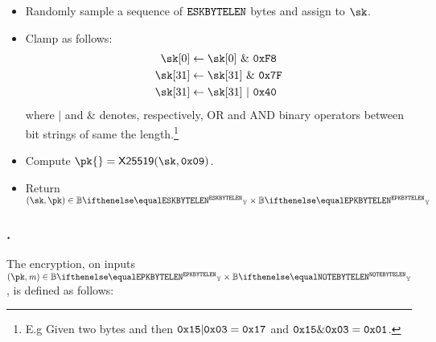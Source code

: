 \begin{itemize}
    \item Randomly sample a sequence of $\mathtt{ESKBYTELEN}$ bytes and assign to $\sk$.
    \item Clamp \sk{} as follows:
    \begin{align*}
        \sk[0] &\gets \sk[0]\ \&\ \bytestyle{F8}\\
        \sk[31] &\gets \sk[31]\ \&\ \bytestyle{7F}\\
        \sk[31] &\gets \sk[31]\ |\ \bytestyle{40}
    \end{align*}
    where $|$ and $\&$ denotes, respectively, OR and AND binary operators between bit strings of same the length.\footnote{E.g Given two bytes  and  then $\texttt{0x15} | \texttt{0x03} = \texttt{0x17}$ and $\texttt{0x15} \& \texttt{0x03} = \texttt{0x01}$.}
    \item Compute $\pk{} = \xscalarmult{25519}(\sk, \bytestyle{09})$.
    \item Return $(\sk, \pk) \in \BBy{\eskByteLen} \times \BBy{\epkByteLen}$
\end{itemize}

\subsubsection{\encscheme.\enc}

The encryption, on inputs $(\pk, \msg) \in \BBy{\epkByteLen} \times \BBy{\noteByteLen}$, is defined as follows:

